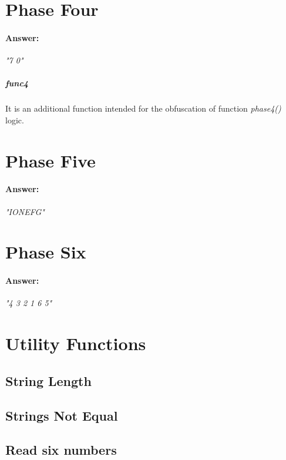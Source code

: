 \documentclass{article}
\begin{document}
\section{Phase Four}
\paragraph{Answer:}
\emph{"7 0"}

\subparagraph{func4}
It is an additional function intended for the obfuscation of function \emph{phase4()} logic.

\section{Phase Five}
\paragraph{Answer:}
\emph{"IONEFG"}

\section{Phase Six}
\paragraph{Answer:}
\emph{"4 3 2 1 6 5"}

\newpage
\section{Utility Functions}
\subsection{String Length}

\subsection{Strings Not Equal}

\subsection{Read six numbers}

\end{document}
